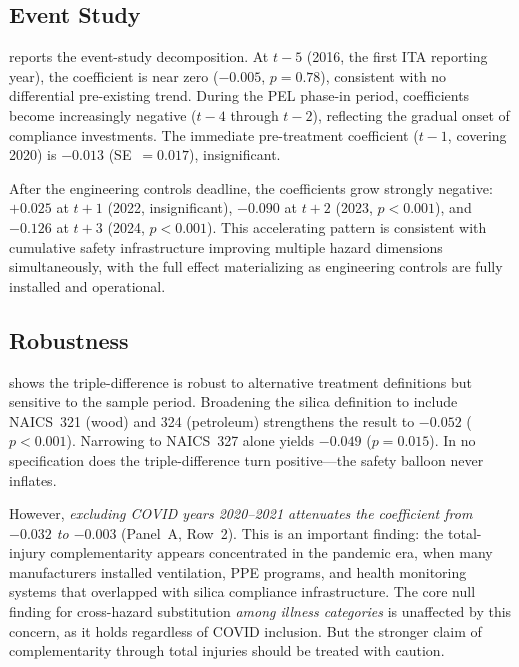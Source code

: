 \documentclass[12pt]{article}
\begin{document}
\subsection{Event Study}



 reports the event-study decomposition. At $t - 5$ (2016, the first ITA reporting year), the coefficient is near zero ($-0.005$, $p = 0.78$), consistent with no differential pre-existing trend. During the PEL phase-in period, coefficients become increasingly negative ($t - 4$ through $t - 2$), reflecting the gradual onset of compliance investments. The immediate pre-treatment coefficient ($t - 1$, covering 2020) is $-0.013$ (SE~$= 0.017$), insignificant.

After the engineering controls deadline, the coefficients grow strongly negative: $+0.025$ at $t + 1$ (2022, insignificant), $-0.090$ at $t + 2$ (2023, $p < 0.001$), and $-0.126$ at $t + 3$ (2024, $p < 0.001$). This accelerating pattern is consistent with cumulative safety infrastructure improving multiple hazard dimensions simultaneously, with the full effect materializing as engineering controls are fully installed and operational.

\subsection{Robustness}



 shows the triple-difference is robust to alternative treatment definitions but sensitive to the sample period. Broadening the silica definition to include NAICS~321 (wood) and 324 (petroleum) strengthens the result to $-0.052$ ($p < 0.001$). Narrowing to NAICS~327 alone yields $-0.049$ ($p = 0.015$). In no specification does the triple-difference turn positive---the safety balloon never inflates.

However, \textit{excluding COVID years 2020--2021 attenuates the coefficient from $-0.032$ to $-0.003$} (Panel~A, Row~2). This is an important finding: the total-injury complementarity appears concentrated in the pandemic era, when many manufacturers installed ventilation, PPE programs, and health monitoring systems that overlapped with silica compliance infrastructure. The core null finding for cross-hazard substitution \textit{among illness categories} is unaffected by this concern, as it holds regardless of COVID inclusion. But the stronger claim of complementarity through total injuries should be treated with caution.
\end{document}
